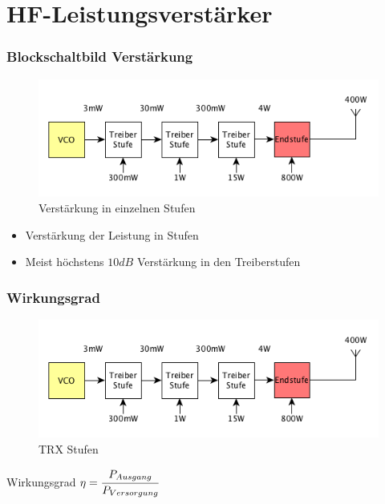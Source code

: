 \section*{HF-Leistungs\-verstärker}

\begin{frame}
  \frametitle{Blockschaltbild Verstärkung}
  \begin{center}
    \begin{figure}
      \includegraphics[width=1\textwidth,height=.5\textheight,keepaspectratio]{a07/paBsb.png}
      \caption{Verstärkung in einzelnen Stufen}
    \end{figure}
    \begin{itemize}
      \item Verstärkung der Leistung in Stufen
      \item Meist höchstens $10dB$ Verstärkung in den Treiberstufen
    \end{itemize}
  \end{center}
\end{frame}

\begin{frame}
  \frametitle{Wirkungsgrad}
  \begin{center}
    \begin{figure}
      \includegraphics[width=1\textwidth,height=.5\textheight,keepaspectratio]{a07/paBsb.png}
      \caption{TRX Stufen}
    \end{figure}
    \begin{block}{Wirkungsgrad}
      $\eta = \cfrac{P_{Ausgang}}{P_{Versorgung}}$
    \end{block}
  \end{center}
\end{frame}

